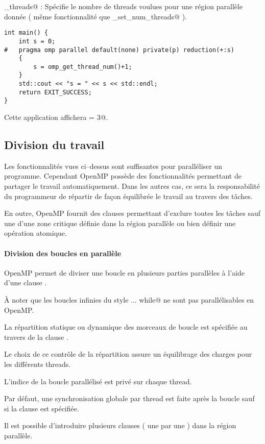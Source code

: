 \documentclass[fleqn,11pt]{article}
\begin{document}
\lstinline@num_threads@ : Spécifie le nombre de threads voulues pour une région parallèle donnée ( même fonctionnalité que
\lstinline@omp_set_num_threads@ ).

\begin{lstlisting}
int main() {
    int s = 0;
#   pragma omp parallel default(none) private(p) reduction(+:s)
    {
        s = omp_get_thread_num()+1;
    }
    std::cout << "s = " << s << std::endl;
    return EXIT_SUCCESS;
}
\end{lstlisting}

Cette application affichera \verb@s = 3@.

\subsection{Division du travail}

Les fonctionnalités vues ci--dessus sont suffisantes pour paralléliser un programme.
Cependant OpenMP possède des fonctionnalités permettant de partager le travail automatiquement.
Dans les autres cas, ce sera la responsabilité du programmeur de répartir de façon équilibrée le travail
au travers des tâches.

En outre, OpenMP fournit des clauses permettant d'exclure toutes les tâches sauf une d'une zone critique définie
dans la région parallèle ou bien définir une opération atomique.

\paragraph{Division des boucles en parallèle}

OpenMP permet de diviser une boucle en plusieurs parties parallèles à l'aide d'une clause \verb@for@.

À noter que les boucles infinies du style \lstinline@do ... while@ ne sont pas parallélisables
en OpenMP.

La répartition statique ou dynamique des morceaux de boucle est spécifiée au travers de la clause
\verb@schedule@.

Le choix de ce contrôle de la répartition assure un équilibrage des charges pour les différents threads.

L'indice de la boucle parallélisé est privé sur chaque thread.

Par défaut, une synchronisation globale par thread est faite après la boucle sauf si la clause \verb@nowait@
est spécifiée.

Il est possible d'introduire plusieurs clauses \verb@for@ ( une par une ) dans la région parallèle.
\end{document}
